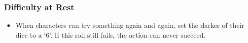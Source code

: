 \subsubsection*{Difficulty at Rest}

\begin{itemize}
  \item
  When characters can try something again and again, set the darker of their dice to a `6'.
  If this roll still fails, the action can never succeed.
\end{itemize}
